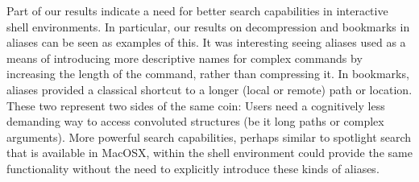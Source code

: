 Part of our results indicate a need for better search capabilities in interactive shell environments.
In particular, our results on decompression and bookmarks in aliases can be seen as examples of this. 
It was interesting seeing aliases used as a means of introducing more descriptive names for complex commands by increasing the length of the command, rather than compressing it.
In bookmarks, aliases provided a classical shortcut to a longer (local or remote) path or location.
These two represent two sides of the same coin: Users need a cognitively less demanding way to access convoluted structures (be it long paths or complex arguments).
More powerful search capabilities, perhaps similar to spotlight search that is available in MacOSX, within the shell environment could provide the same functionality without the need to explicitly introduce these kinds of aliases.




